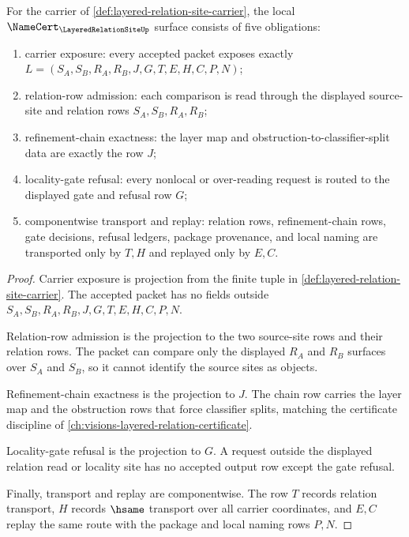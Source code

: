 \begin{theorem}
\label{thm:layered-relation-site-namecert-obligations}
For the carrier of \autoref{def:layered-relation-site-carrier}, the local $\NameCert_{\LayeredRelationSiteUp}$ surface consists of five obligations:
\begin{enumerate}
\item carrier exposure: every accepted packet exposes exactly $L=(S_A,S_B,R_A,R_B,J,G,T,E,H,C,P,N)$;
\item relation-row admission: each comparison is read through the displayed source-site and relation rows $S_A,S_B,R_A,R_B$;
\item refinement-chain exactness: the layer map and obstruction-to-classifier-split data are exactly the row $J$;
\item locality-gate refusal: every nonlocal or over-reading request is routed to the displayed gate and refusal row $G$;
\item componentwise transport and replay: relation rows, refinement-chain rows, gate decisions, refusal ledgers, package provenance, and local naming are transported only by $T,H$ and replayed only by $E,C$.
\end{enumerate}
\end{theorem}
\begin{proof}
Carrier exposure is projection from the finite tuple in \autoref{def:layered-relation-site-carrier}. The accepted packet has no fields outside $S_A,S_B,R_A,R_B,J,G,T,E,H,C,P,N$.

Relation-row admission is the projection to the two source-site rows and their relation rows. The packet can compare only the displayed $R_A$ and $R_B$ surfaces over $S_A$ and $S_B$, so it cannot identify the source sites as objects.

Refinement-chain exactness is the projection to $J$. The chain row carries the layer map and the obstruction rows that force classifier splits, matching the certificate discipline of \autoref{ch:visions-layered-relation-certificate}.

Locality-gate refusal is the projection to $G$. A request outside the displayed relation read or locality site has no accepted output row except the gate refusal.

Finally, transport and replay are componentwise. The row $T$ records relation transport, $H$ records $\hsame$ transport over all carrier coordinates, and $E,C$ replay the same route with the package and local naming rows $P,N$.
\end{proof}

